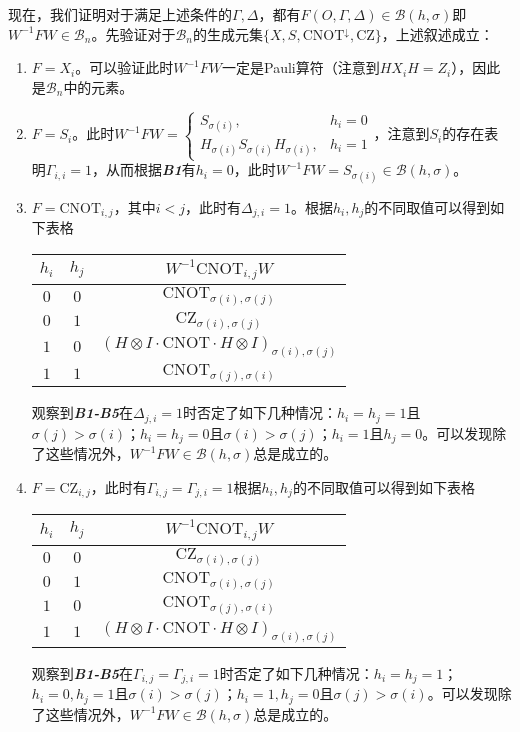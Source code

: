 \documentclass[8pt]{article}
\begin{document}
\begin{appendices}
现在，我们证明对于满足上述条件的$\Gamma, \Delta$，都有$F(O, \Gamma, \Delta) \in \mathcal B(h, \sigma)$即$W^{-1}FW \in \mathcal B_n$。先验证对于$\mathcal B_n$的生成元集$\{X, S, \text{CNOT}^{\downarrow}, \text{CZ}\}$，上述叙述成立：
\begin{enumerate}
	\item $F = X_i$。可以验证此时$W^{-1}FW$一定是Pauli算符（注意到$HX_iH = Z_i$），因此是$\mathcal B_n$中的元素。
	\item $F = S_i$。此时$W^{-1}FW = \begin{cases}
	S_{\sigma(i)}, & h_i = 0\\
	H_{\sigma(i)}S_{\sigma(i)}H_{\sigma(i)}, & h_i = 1
	\end{cases}$，注意到$S_i$的存在表明$\Gamma_{i, i}=1$，从而根据\textbf{\textit{B1}}有$h_i=0$，此时$W^{-1}FW = S_{\sigma(i)} \in \mathcal B(h, \sigma)$。 
	\item $F = \text{CNOT}_{i, j}$，其中$i < j$，此时有$\Delta_{j, i} = 1$。根据$h_i, h_j$的不同取值可以得到如下表格
	\begin{center}
	\begin{tabular}{c|c|c}
		$h_i$ & $h_j$ & $W^{-1}\text{CNOT}_{i, j}W$\\
		\hline
		$0$ & $0$ & $\text{CNOT}_{\sigma(i), \sigma(j)}$\\
		$0$ & $1$ & $\text{CZ}_{\sigma(i), \sigma(j)}$\\
		$1$ & $0$ & $(H \otimes I \cdot \text{CNOT} \cdot H \otimes I)_{\sigma(i), \sigma(j)}$\\
		$1$ & $1$ & $\text{CNOT}_{\sigma(j), \sigma(i)}$\\
	\end{tabular}
	\end{center}
	观察到\textbf{\textit{B1-B5}}在$\Delta_{j,i} = 1$时否定了如下几种情况：$h_i = h_j = 1$且$\sigma(j) > \sigma(i)$；$h_i = h_j = 0$且$\sigma(i) > \sigma(j)$；$h_i = 1$且$h_j = 0$。可以发现除了这些情况外，$W^{-1}FW \in \mathcal B(h, \sigma)$总是成立的。
	\item $F = \text{CZ}_{i,j}$，此时有$\Gamma_{i,j} = \Gamma_{j,i} = 1$根据$h_i, h_j$的不同取值可以得到如下表格
	\begin{center}
	\begin{tabular}{c|c|c}
		$h_i$ & $h_j$ & $W^{-1}\text{CNOT}_{i, j}W$\\
		\hline
		$0$ & $0$ & $\text{CZ}_{\sigma(i), \sigma(j)}$\\
		$0$ & $1$ & $\text{CNOT}_{\sigma(i), \sigma(j)}$\\
		$1$ & $0$ & $\text{CNOT}_{\sigma(j), \sigma(i)}$\\
		$1$ & $1$ & $(H \otimes I \cdot \text{CNOT} \cdot H \otimes I)_{\sigma(i), \sigma(j)}$\\
	\end{tabular}
	\end{center}
	观察到\textbf{\textit{B1-B5}}在$\Gamma_{i,j} = \Gamma_{j,i} = 1$时否定了如下几种情况：$h_i = h_j = 1$；$h_i = 0, h_j = 1$且$\sigma(i) > \sigma(j)$；$h_i = 1, h_j = 0$且$\sigma(j) > \sigma(i)$。可以发现除了这些情况外，$W^{-1}FW \in \mathcal B(h, \sigma)$总是成立的。
\end{enumerate}


\end{appendices}
\end{document}
